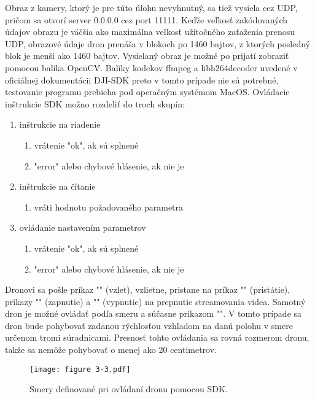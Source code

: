 {Obraz z kamery, ktorý je pre túto úlohu nevyhnutný, sa tiež vysiela cez UDP, pričom sa otvorí server 0.0.0.0 cez port 11111. Keďže veľkosť zakódovaných údajov obrazu je väčšia ako maximálna veľkosť užitočného zaťaženia prenosu UDP, obrazové údaje dron prenáša v blokoch po 1460 bajtov, z ktorých posledný blok je menší ako 1460 bajtov. Vysielaný obraz je možné po prijatí zobraziť pomocou balíka OpenCV. Balíky kodekov ffmpeg a libh264decoder uvedené v oficiálnej dokumentácii DJI-SDK preto v tomto prípade nie sú potrebné, testovanie programu prebieha pod operačným systémom MacOS. 
Ovládacie inštrukcie SDK možno rozdeliť do troch skupín: 
\begin{enumerate}
\item inštrukcie na riadenie 
\begin{enumerate}
    \item vrátenie "ok", ak sú splnené 
    \item "error" alebo chybové hlásenie, ak nie je 
\end{enumerate}
\item inštrukcie na čítanie 
\begin{enumerate}
    \item vráti hodnotu požadovaného parametra
\end{enumerate}
\item ovládanie nastavením parametrov 
\begin{enumerate}
    \item vrátenie "ok", ak sú splnené 
    \item "error" alebo chybové hlásenie, ak nie je 
\end{enumerate}
\end{enumerate}



Dronovi sa pošle príkaz "" (vzlet), vzlietne, pristane na príkaz "" (pristátie), príkazy "" (zapnutie) a "" (vypnutie) na prepnutie streamovania videa. Samotný dron je možné ovládať podľa smeru a súčasne príkazom "". V tomto prípade sa dron bude pohybovať zadanou rýchlosťou vzhľadom na danú polohu v smere určenom tromi súradnicami. Presnosť tohto ovládania sa rovná rozmerom dronu, takže sa nemôže pohybovať o menej ako 20 centimetrov. 

\begin{figure}[ht!]
    \centering
    \texttt{[image: figure 3-3.pdf]}
    \caption{Smery definované pri ovládaní dronu pomocou SDK.}
    \label{o:3-3}


\end{figure}}
